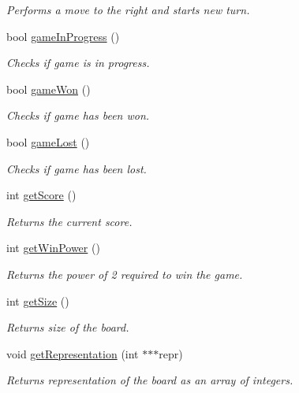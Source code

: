 \begin{DoxyCompactItemize}
\begin{DoxyCompactList}\small\item\em Performs a move to the right and starts new turn. \end{DoxyCompactList}\item 
bool \hyperlink{class_nulocks_1_1_core_1_1_board_a2b09be0742a2a27714190967e3e7cd82}{game\-In\-Progress} ()
\begin{DoxyCompactList}\small\item\em Checks if game is in progress. \end{DoxyCompactList}\item 
bool \hyperlink{class_nulocks_1_1_core_1_1_board_a34ebd6854e42bbe15fd24f27969ee4bd}{game\-Won} ()
\begin{DoxyCompactList}\small\item\em Checks if game has been won. \end{DoxyCompactList}\item 
bool \hyperlink{class_nulocks_1_1_core_1_1_board_a23dce584fcd089fef50f4ea58fb513e3}{game\-Lost} ()
\begin{DoxyCompactList}\small\item\em Checks if game has been lost. \end{DoxyCompactList}\item 
int \hyperlink{class_nulocks_1_1_core_1_1_board_a5108bbb1bad0da37d8cdad5219aed245}{get\-Score} ()
\begin{DoxyCompactList}\small\item\em Returns the current score. \end{DoxyCompactList}\item 
int \hyperlink{class_nulocks_1_1_core_1_1_board_a0138822cc860c8bb400e878f2dae6617}{get\-Win\-Power} ()
\begin{DoxyCompactList}\small\item\em Returns the power of 2 required to win the game. \end{DoxyCompactList}\item 
int \hyperlink{class_nulocks_1_1_core_1_1_board_a0e2d920142481d08f882a4a23f2389a4}{get\-Size} ()
\begin{DoxyCompactList}\small\item\em Returns size of the board. \end{DoxyCompactList}\item 
void \hyperlink{class_nulocks_1_1_core_1_1_board_ae7acd65ef0945fdaccf67678e09c6ee4}{get\-Representation} (int $\ast$$\ast$$\ast$repr)
\begin{DoxyCompactList}\small\item\em Returns representation of the board as an array of integers. \end{DoxyCompactList}\end{DoxyCompactItemize}


